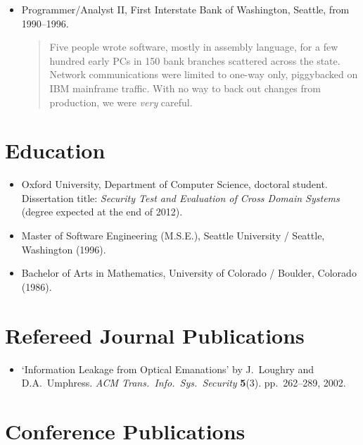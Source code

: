 \documentclass[letterpaper]{article}
\begin{document}
\begin{itemize}
	\item Programmer/Analyst II, First Interstate Bank of Washington, Seattle, from 1990--1996.

		\begin{quote}\vspace{-2mm}
			Five people wrote software, mostly in assembly language, for a few hundred early PCs
			in 150 bank branches scattered across the state.  Network communications were limited
			to one-way only, piggybacked on IBM mainframe traffic.  With no way to back out
			changes from production, we were \emph{very} careful.
		\end{quote}

\end{itemize}

\section*{Education} %

\begin{itemize}
    \item Oxford University, Department of Computer Science,
		doctoral student.  Dissertation title: \emph{Security Test and Evaluation
		of Cross Domain Systems} (degree expected at the end of 2012).

    \item Master of Software Engineering (M.S.E.), Seattle
		University / Seattle, Washington (1996).

    \item Bachelor of Arts in Mathematics, University of
		Colorado / Boulder, Colorado (1986).
\end{itemize}

\section*{Refereed Journal Publications} %

\begin{itemize}
    \item `Information Leakage from Optical Emanations' by J.\ Loughry
    and D.A.\ Umphress. \emph{ACM Trans.\ Info.\ Sys.\ Security} \textbf{5}(3).
    pp.\ 262--289, 2002.
\end{itemize}

\section*{Conference Publications} %
\end{document}
